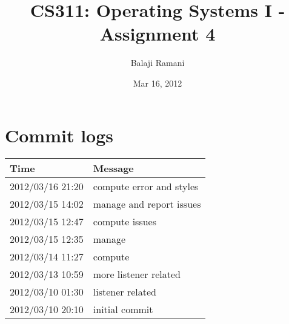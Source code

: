 \documentclass[letterpaper,10pt,twocolumn,titlepage]{article}
\begin{document}
\title{CS311: Operating Systems I - Assignment 4}
\author{Balaji Ramani}
\date{Mar 16, 2012}
\maketitle

\section{Commit logs}
  \begin{tabular}{ | l | l |}
    \hline
    Time & Message\\ \hline
2012/03/16 21:20 & compute error and styles \\ \hline
2012/03/15 14:02 & manage and report issues \\ \hline
2012/03/15 12:47 & compute issues \\ \hline
2012/03/15 12:35 & manage \\ \hline
2012/03/14 11:27 & compute \\ \hline
2012/03/13 10:59 & more listener related \\ \hline
2012/03/10 01:30 & listener related \\ \hline
2012/03/10 20:10 & initial commit \\ \hline
  \end{tabular}
\end{document}
